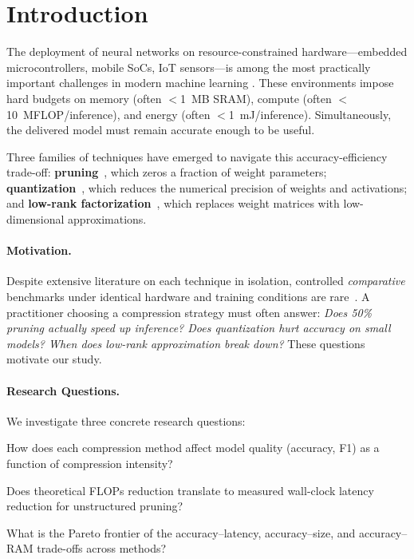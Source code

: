\section{Introduction}
\label{sec:intro}

The deployment of neural networks on resource-constrained hardware—embedded
microcontrollers, mobile SoCs, IoT sensors—is among the most practically
important challenges in modern machine learning
\citep{warden2019tinyml,cheng2017survey}.
These environments impose hard budgets on memory (often $<$1~MB SRAM),
compute (often $<$10~MFLOP/inference), and energy (often $<$1~mJ/inference).
Simultaneously, the delivered model must remain accurate enough to be useful.

Three families of techniques have emerged to navigate this
accuracy-efficiency trade-off:
\textbf{pruning}~\citep{lecun1990optimal,han2015learning},
which zeros a fraction of weight parameters;
\textbf{quantization}~\citep{jacob2018quantization,hubara2017quantized},
which reduces the numerical precision of weights and activations; and
\textbf{low-rank factorization}~\citep{denton2014exploiting,li2018constrained},
which replaces weight matrices with low-dimensional approximations.

\paragraph{Motivation.}
Despite extensive literature on each technique in isolation, controlled
\emph{comparative} benchmarks under identical hardware and training conditions
are rare~\citep{blalock2020state}.
A practitioner choosing a compression strategy must often answer:
\emph{Does 50\% pruning actually speed up inference?
Does quantization hurt accuracy on small models?
When does low-rank approximation break down?}
These questions motivate our study.

\paragraph{Research Questions.}
We investigate three concrete research questions:
\begin{description}[leftmargin=1.5em]
  \item[\textbf{RQ1}] How does each compression method affect model quality
    (accuracy, F1) as a function of compression intensity?
  \item[\textbf{RQ2}] Does theoretical FLOPs reduction translate to
    measured wall-clock latency reduction for unstructured pruning?
  \item[\textbf{RQ3}] What is the Pareto frontier of the
    accuracy--latency, accuracy--size, and accuracy--RAM trade-offs
    across methods?
\end{description}

